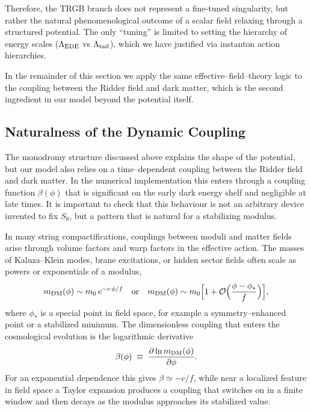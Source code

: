 \documentclass[a4paper,11pt]{article}
\begin{document}
Therefore, the TRGB branch does not represent a fine-tuned singularity, but rather the natural phenomenological outcome of a scalar field relaxing through a structured potential. The only ``tuning'' is limited to setting the hierarchy of energy scales ($\Lambda_{\rm EDE}$ vs $\Lambda_{\rm tail}$), which we have justified via instanton action hierarchies.

In the remainder of this section we apply the same effective--field--theory logic to the coupling between the Ridder field and dark matter, which is the second ingredient in our model beyond the potential itself.


\subsection{Naturalness of the Dynamic Coupling}
\label{sec:coupling_naturalness}

The monodromy structure discussed above explains the shape of the potential, but our model also relies on a time--dependent coupling between the Ridder field and dark matter. In the numerical implementation this enters through a coupling function $\beta(\phi)$ that is significant on the early dark energy shelf and negligible at late times. It is important to check that this behaviour is not an arbitrary device invented to fix $S_8$, but a pattern that is natural for a stabilizing modulus.

In many string compactifications, couplings between moduli and matter fields arise through volume factors and warp factors in the effective action. The masses of Kaluza--Klein modes, brane excitations, or hidden sector fields often scale as powers or exponentials of a modulus,
\begin{equation}
m_{\rm DM}(\phi) \sim m_0\,e^{-c\,\phi/f} \quad \text{or} \quad m_{\rm DM}(\phi) \sim m_0\Bigl[1 + \mathcal{O}\Bigl(\frac{\phi-\phi_\ast}{f}\Bigr)\Bigr],
\end{equation}
where $\phi_\ast$ is a special point in field space, for example a symmetry--enhanced point or a stabilized minimum. The dimensionless coupling that enters the cosmological evolution is the logarithmic derivative
\begin{equation}
\beta(\phi) \;\equiv\; \frac{\partial \ln m_{\rm DM}(\phi)}{\partial \phi}.
\end{equation}
For an exponential dependence this gives $\beta \simeq -c/f$, while near a localized feature in field space a Taylor expansion produces a coupling that switches on in a finite window and then decays as the modulus approaches its stabilized value.
\end{document}
